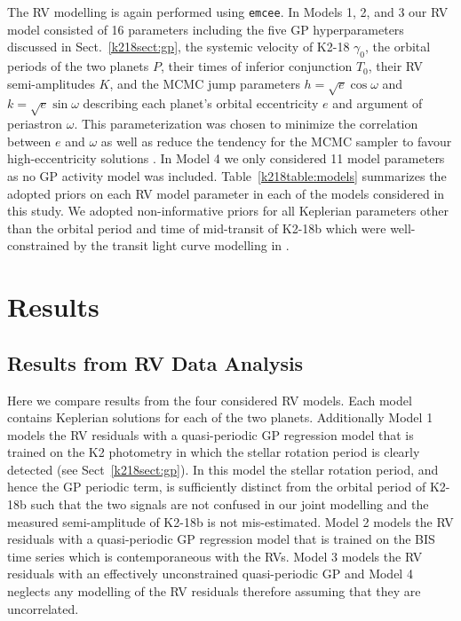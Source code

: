 The RV modelling is again performed using \texttt{emcee}. In Models 1, 2, and 3
our RV model consisted of 16 parameters including
the five GP hyperparameters discussed in Sect.~\ref{k218sect:gp}, the systemic velocity of K2-18 $\gamma_0$, the orbital periods
of the two planets $P$, their times of inferior conjunction $T_0$, their RV semi-amplitudes $K$,
and the MCMC jump parameters
$h=\sqrt{e}\cos{\omega}$ and $k=\sqrt{e}\sin{\omega}$ describing each planet's orbital eccentricity $e$
and argument of periastron $\omega$. This parameterization was chosen to minimize the correlation between
$e$ and $\omega$ as well as reduce the tendency for the MCMC sampler to favour high-eccentricity solutions
\citep{ford06}. In Model 4 we only considered 11 model parameters as no GP activity model was included. 
Table~\ref{k218table:models} summarizes the adopted priors on each RV model parameter in each
of the models considered in this study. We adopted non-informative priors for all Keplerian parameters other than the 
orbital period and time of mid-transit of K2-18b which were well-constrained by the transit light curve modelling in 
. 




\section{Results} \label{k218sect:results}
\subsection{Results from RV Data Analysis}
Here we compare results from the four considered RV models. Each model contains Keplerian solutions for
each of the two planets. Additionally Model 1 models the RV residuals with a quasi-periodic GP regression model
that is trained on the K2 photometry in which the stellar rotation period is clearly detected
(see Sect~\ref{k218sect:gp}). In this model
the stellar rotation period, and hence the GP periodic term, is sufficiently distinct from the orbital period
of K2-18b such that the two signals are not confused in our joint modelling and the measured semi-amplitude of
K2-18b is not mis-estimated. Model 2 models the RV residuals with a quasi-periodic GP regression
model that is trained on the BIS time series which is contemporaneous with the RVs.
Model 3 models the RV residuals with an effectively unconstrained quasi-periodic GP and Model 4 neglects
any modelling of the RV residuals therefore assuming that they are uncorrelated. \\

